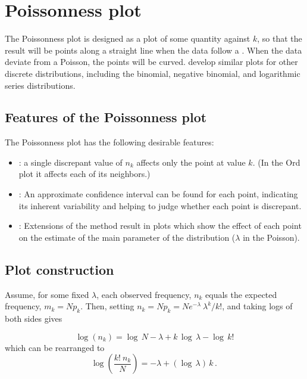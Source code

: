 \section{Poissonness plot}\label{sec:discrete-Poissonness}

The Poissonness plot
\citep{Hoaglin:80}
is designed as a plot of some
quantity against \(k\), so that the result will be points along a
straight line when the data follow a .  When the
data deviate from a Poisson, the points will be curved.
\citet{HoaglinTukey:85}
develop similar plots for other discrete distributions,
including the binomial, negative binomial, and logarithmic series
distributions.

\subsection{Features of the Poissonness plot}
The Poissonness plot has the following desirable features:
\begin{itemize}
\item {}: a single discrepant value of \(n_k\)
       affects only the point at value \(k\).  (In the Ord plot
       it affects each of its neighbors.)
\item {}:  An approximate confidence
       interval can be found for each point, indicating its inherent
       variability and helping to judge whether each point is
       discrepant.
\item {}:  Extensions of the method result in
       plots which show the effect of each point on the estimate of
       the main parameter of the distribution (\(\lambda\) in the
       Poisson).
\end{itemize}

\subsection{Plot construction}
Assume, for some fixed \(\lambda\), each observed frequency, \(n_k\)
equals the expected frequency, \(m_k = N p_k\).  Then, setting
\(n_k = N p_k  = N { e^{ - \lambda } \:  \lambda^k } /  { k ! }\),
and taking logs of both sides gives

\begin{equation*}
  \log ( n_k ) = \log \,  N - \lambda  +  k \,  \log \,  \lambda  -
  \log \,  k !
\end{equation*}
which can be rearranged to
\begin{equation} \label{eq:poispl}
  \log \left(  \frac{ k ! \:  n_k } {N} \right)
 = - \lambda  +  ( \log \,  \lambda ) \,  k
 \period
\end{equation}

